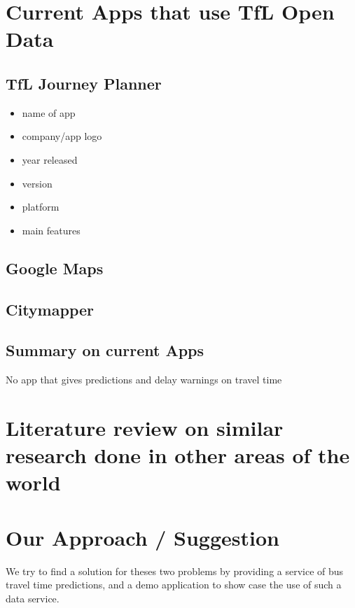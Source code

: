 \section{Current Apps that use TfL Open Data}


\subsection{TfL Journey Planner}

\begin{itemize}
  \item name of app
  \item company/app logo
  \item year released
  \item version
  \item platform
  \item main features
\end{itemize}

\subsection{Google Maps}

\subsection{Citymapper}

\subsection{Summary on current Apps}
No app that gives predictions and delay warnings on travel time

\section{
Literature review on similar research done in other areas of the world}


\section{Our Approach / Suggestion}
We try to find a solution for theses two problems by providing a service of bus travel time predictions, and a demo application to show case the use of such a data service.




